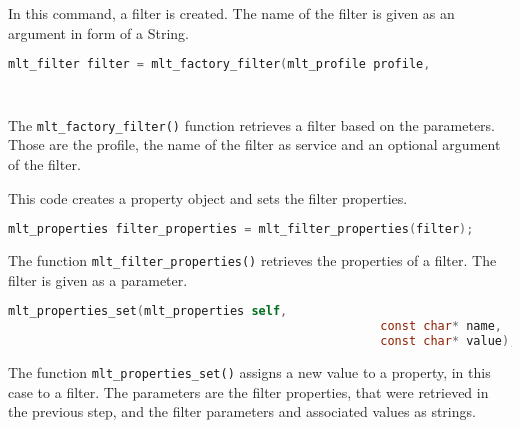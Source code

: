 \documentclass[../MasterThesis.tex]{subfiles}
\begin{document}
\begin{description}[font=\color{RedViolet!80!black}, style=nextline]
	
	
	\item[Create a filter] 
	
	In this command, a filter is created. The name of the filter is given as an argument in form of a String.
	
	\begin{lstlisting}[language=C, numbers=none, columns=fullflexible, belowskip=0pt, aboveskip=9pt]
	mlt_filter filter = mlt_factory_filter(mlt_profile profile, 
																						const char* service, 
																						const void* input); \end{lstlisting}
														
	The \texttt{mlt\_factory\_filter()} function retrieves a filter based on the parameters. Those are the profile, the name of the filter as service and an optional argument of the filter.



	\item[Create and set filter properties] 

	This code creates a property object and sets the filter properties.

	\begin{lstlisting}[language=C, numbers=none, columns=fullflexible, belowskip=0pt, aboveskip=9pt]
	mlt_properties filter_properties = mlt_filter_properties(filter); \end{lstlisting}

	The function \texttt{mlt\_filter\_properties()} retrieves the properties of a filter. The filter is given as a parameter.

	\begin{lstlisting}[language=C, numbers=none, columns=fullflexible, belowskip=0pt, aboveskip=9pt]
	mlt_properties_set(mlt_properties self, 
													const char* name, 
													const char* value); \end{lstlisting}

	The function \texttt{mlt\_properties\_set()} assigns a new value to a property, in this case to a filter. The parameters are the filter properties, that were retrieved in the previous step, and the filter parameters and associated values as strings.
	
	
	
	
	\item[Connect elements] 
	

\end{description}
\end{document}
